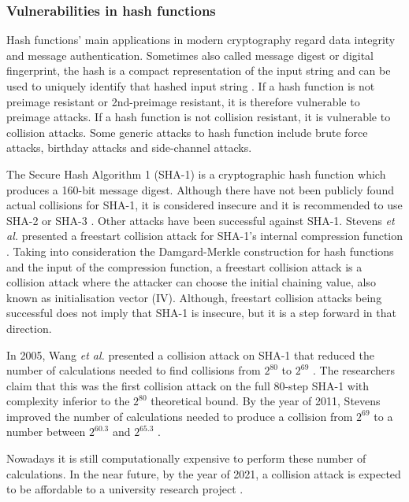 \documentclass{sig-alternate-05-2015}
\begin{document}
\subsubsection{Vulnerabilities in hash functions}

Hash functions' main applications in modern cryptography regard data integrity and message authentication. Sometimes also called message digest or digital fingerprint, the hash is a compact representation of the input string and can be used to uniquely identify that hashed input string \cite{Menezes1996-ch9}.
If a hash function is not preimage resistant or 2nd-preimage resistant, it is therefore vulnerable to preimage attacks. If a hash function is not collision resistant, it is vulnerable to collision attacks.
Some generic attacks to hash function include brute force attacks, birthday attacks and side-channel attacks.

The Secure Hash Algorithm 1 (SHA-1) is a cryptographic hash function which produces a 160-bit message digest. Although there have not been publicly found actual collisions for SHA-1, it is considered insecure and it is recommended to use SHA-2 or SHA-3 \cite{Schneier15}.
Other attacks have been successful against SHA-1. Stevens \textit{et al.} presented a freestart collision attack for SHA-1's internal compression function \cite{Stevens15}. Taking into consideration the Damgard-Merkle \cite{Merkle79} construction for hash functions and the input of the compression function, a freestart collision attack is a collision attack where the attacker can choose the initial chaining value, also known as initialisation vector (IV). Although, freestart collision attacks being successful does not imply that SHA-1 is insecure, but it is a step forward in that direction.

In 2005, Wang \textit{et al.} presented a collision attack on SHA-1 that reduced the number of calculations needed to find collisions from $2^{80}$ to $2^{69}$ \cite{Wang05}. The researchers claim that this was the first collision attack on the full 80-step SHA-1 with complexity inferior to the $2^{80}$ theoretical bound. By the year of 2011, Stevens improved the number of calculations needed to produce a collision from $2^{69}$ to a number between $2^{60.3}$ and $2^{65.3}$ \cite{Stevens11}.

Nowadays it is still computationally expensive to perform these number of calculations. In the near future, by the year of 2021, a collision attack is expected to be affordable to a university research project \cite{Schneier12}.
\end{document}
